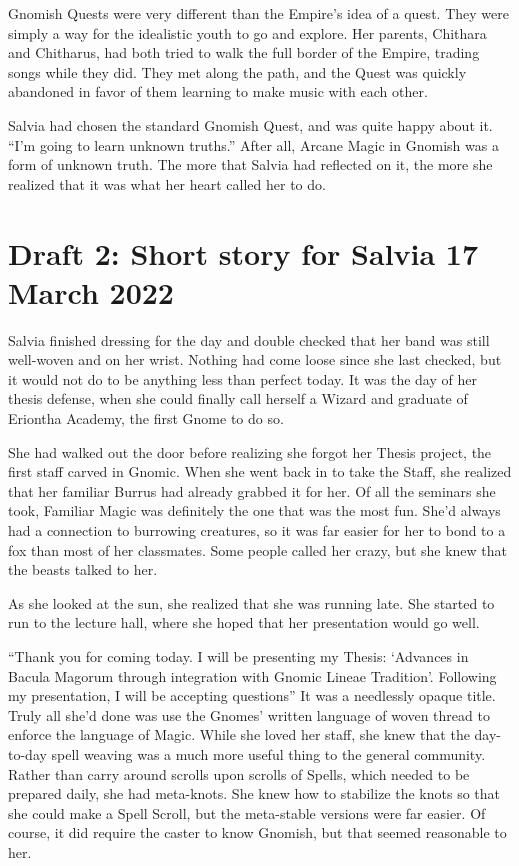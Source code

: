 \documentclass[12pt]{article}[titlepage]
\newcommand{\say}[1]{``#1''}
\newcommand{\nsay}[1]{`#1'}
\renewcommand{\,}{\textsuperscript{,}}
\begin{document}
Gnomish Quests were very different than the Empire's idea of a quest.
They were simply a way for the idealistic youth to go and explore.
Her parents, Chithara and Chitharus, had both tried to walk the full border of the Empire, trading songs while they did.
They met along the path, and the Quest was quickly abandoned in favor of them learning to make music with each other.

Salvia had chosen the standard Gnomish Quest, and was quite happy about it.
\say{I'm going to learn unknown truths.}
After all, Arcane Magic in Gnomish was a form of unknown truth.
The more that Salvia had reflected on it, the more she realized that it was what her heart called her to do.



\section{Draft 2: Short story for Salvia 17 March 2022}
Salvia finished dressing for the day and double checked that her band was still well-woven and on her wrist.
Nothing had come loose since she last checked, but it would not do to be anything less than perfect today.
It was the day of her thesis defense, when she could finally call herself a Wizard and graduate of Eriontha Academy, the first Gnome to do so.

She had walked out the door before realizing she forgot her Thesis project, the first staff carved in Gnomic.
When she went back in to take the Staff, she realized that her familiar Burrus had already grabbed it for her.
Of all the seminars she took, Familiar Magic was definitely the one that was the most fun.
She'd always had a connection to burrowing creatures, so it was far easier for her to bond to a fox than most of her classmates.
Some people called her crazy, but she knew that the beasts talked to her.

As she looked at the sun, she realized that she was running late.
She started to run to the lecture hall, where she hoped that her presentation would go well.

\say{Thank you for coming today.
I will be presenting my Thesis: \nsay{Advances in Bacula Magorum through integration with Gnomic Lineae Tradition}.
Following my presentation, I will be accepting questions}
It was a needlessly opaque title.
Truly all she'd done was use the Gnomes' written language of woven thread to enforce the language of Magic.
While she loved her staff, she knew that the day-to-day spell weaving was a much more useful thing to the general community.
Rather than carry around scrolls upon scrolls of Spells, which needed to be prepared daily, she had meta-knots.
She knew how to stabilize the knots so that she could make a Spell Scroll, but the meta-stable versions were far easier.
Of course, it did require the caster to know Gnomish, but that seemed reasonable to her.
\end{document}
